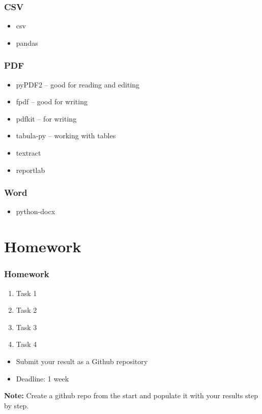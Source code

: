 \documentclass{beamer}
\begin{document}
\begin{frame}
    \frametitle{CSV}
            \begin{itemize}
                \item csv
                \item pandas
            \end{itemize}
\end{frame}

\begin{frame}
    \frametitle{PDF}
            \begin{itemize}
                \item pyPDF2 – good for reading and editing
                \item fpdf – good for writing
                \item pdfkit – for writing
                \item tabula-py – working with tables
                \item textract
                \item reportlab
            \end{itemize}
\end{frame}

\begin{frame}
    \frametitle{Word}
            \begin{itemize}
                \item python-docx                
            \end{itemize}
\end{frame}

\section{Homework} 

\begin{frame}
    \frametitle{Homework}
    \begin{enumerate}
        \item Task 1
        \item Task 2
        \item Task 3
        \item Task 4
    \end{enumerate}

    \vskip 2mm
    \begin{itemize}
        \item Submit your result as a Github repository
        \item Deadline: 1 week %
    \end{itemize}

\vfill
\textbf{Note:} Create a github repo from the start and populate it with your results step by step.
\end{frame}
\end{document}
